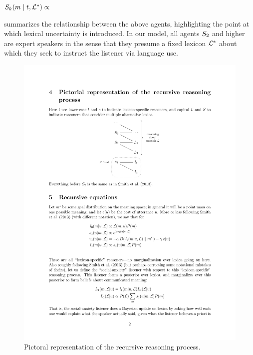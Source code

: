 \begin{definition}[$\SpeakerK$]\label{def:l1}
  $\SpeakerK(\msg \given \state, \LexStar) \propto$
\end{definition}

 summarizes the relationship between the above
agents, highlighting the point at which lexical uncertainty is
introduced. In our model, all agents $\SpeakerK[2]$ and higher are
expert speakers in the sense that they presume a fixed lexicon
$\LexStar$ about which they seek to instruct the listener via language
use.

\begin{figure}[htp]
  \centering
  \includegraphics[scale=1]{images/model}
  \caption{Pictoral representation of the recursive reasoning process.}
  \label{fig:model}
\end{figure}



